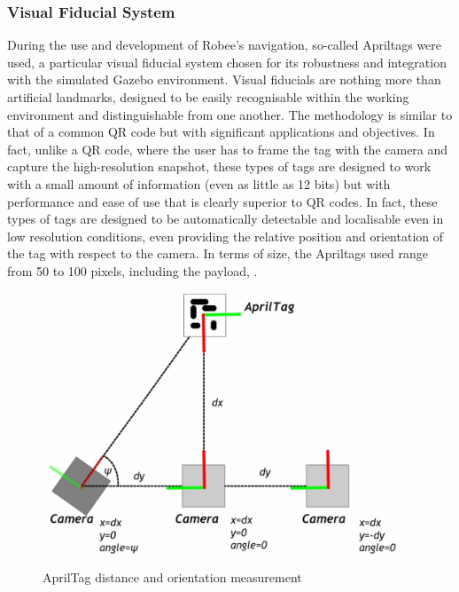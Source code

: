 \subsubsection{Visual Fiducial System}
During the use and development of Robee's navigation, so-called Apriltags were used, a particular visual fiducial system chosen for its robustness and integration with the simulated Gazebo environment.
Visual fiducials are nothing more than artificial landmarks, designed to be easily recognisable within the working environment and distinguishable from one another.
The methodology is similar to that of a common QR code but with significant applications and objectives.
In fact, unlike a QR code, where the user has to frame the tag with the camera and capture the high-resolution snapshot, these types of tags are designed to work with a small amount of information (even as little as 12 bits) but with performance and ease of use that is clearly superior to QR codes. In fact, these types of tags are designed to be automatically detectable and localisable even in low resolution conditions, even providing the relative position and orientation of the tag with respect to the camera.
In terms of size, the Apriltags used range from 50 to 100 pixels, including the payload, \citet{olson2011tags}.
\begin{figure}[H]
    \centering
    \includegraphics[scale=0.25]{Images/Chapter 3/apriltag.jpg}
    \caption{AprilTag distance and orientation measurement}
    \label{fig:apriltag}
\end{figure}

